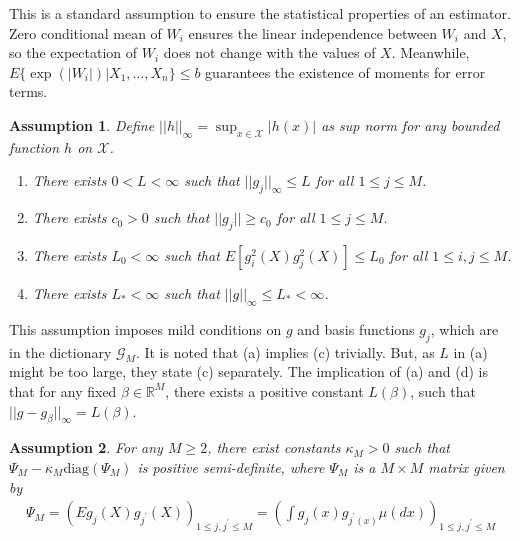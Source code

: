 \documentclass[12pt, a4paper]{article}
\theoremstyle{MAstyle} \newtheorem{assumption}{Assumption}[section]
\theoremstyle{MAstyle} \newtheorem{definition}{Definition}[section]
\theoremstyle{MAstyle} \newtheorem{theorem}{Theorem}[section]
\theoremstyle{MAstyle} \newtheorem{corollary}{Corollary}[section]
\begin{document}
            This is a standard assumption to ensure the statistical properties of an estimator. Zero conditional mean of $W_i$ ensures the linear independence between $W_i$ and $X$, so the expectation of $W_i$ does not change with the values of $X$. Meanwhile, $E\{\exp(|W_i|)|X_1,\ldots,X_n\}\le b$ guarantees the existence of moments for error terms.

            \begin{assumption}\label{assumption_2}
                Define $||h||_{\infty}=\sup_{x \in \mathcal{X}}|h(x)|$ as sup norm for any bounded function $h$ on $\mathcal{X}$.
                \begin{enumerate}[label=(\alph*), noitemsep]
                    \item There exists $0<L<\infty$ such that $||g_j||_{\infty} \le L$ for all $1 \le j \le M$.
                    \item There exists $c_0 >0$ such that $||g_j||\ge c_0$ for all $1 \le j \le M$.
                    \item There exists $L_0 < \infty$ such that $E[g_i^2(X)g_j^2(X)] \le L_0$ for all $1 \le i,j \le M$.
                    \item There exists $L_* < \infty$ such that $||g||_{\infty} \le L_* < \infty$.
                \end{enumerate}
            \end{assumption}

            This assumption imposes mild conditions on $g$ and basis functions $g_j$, which are in the dictionary $\mathcal{G}_M$. It is noted that (a) implies (c) trivially. But, as $L$ in (a) might be too large, they state (c) separately. The implication of (a) and (d) is that for any fixed $\beta \in \mathbb{R}^M$, there exists a positive constant $L(\beta)$, such that $||g-g_{\beta}||_{\infty}=L(\beta)$.

            \begin{assumption}\label{assumption_3}
                For any $M \ge 2$, there exist constants $\kappa_M>0$ such that $\Psi_M-\kappa_M\mathrm{diag}(\Psi_M)$ is positive semi-definite, where $\Psi_M$ is a $M \times M$ matrix given by
                \begin{align}\label{psi_m}
                    \Psi_M=(E g_j(X)g_{j^{\prime}}(X))_{1 \le j,j^{\prime} \le M}=\left( \int g_j(x)g_{j^{\prime}(x)}\mu(dx) \right)_{1 \le j, j^{\prime} \le M}
                \end{align}
            \end{assumption}
\end{document}
